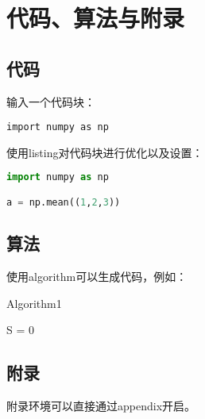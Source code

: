 \chapter{代码、算法与附录}
\section{代码}
输入一个代码块：
\begin{verbatim}
import numpy as np
\end{verbatim}

使用listing对代码块进行优化以及设置：
\lstset{basicstyle = \ttfamily, breaklines = true}
\begin{lstlisting}[language = Python]
import numpy as np

a = np.mean((1,2,3))

\end{lstlisting}

\section{算法}
使用algorithm可以生成代码，例如：

\begin{algorithm}[H]
\caption{Algorithm1}
\label{algo1}
\LinesNumbered
{}
S = 0
\end{algorithm}

\section{附录}
附录环境可以直接通过appendix开启。